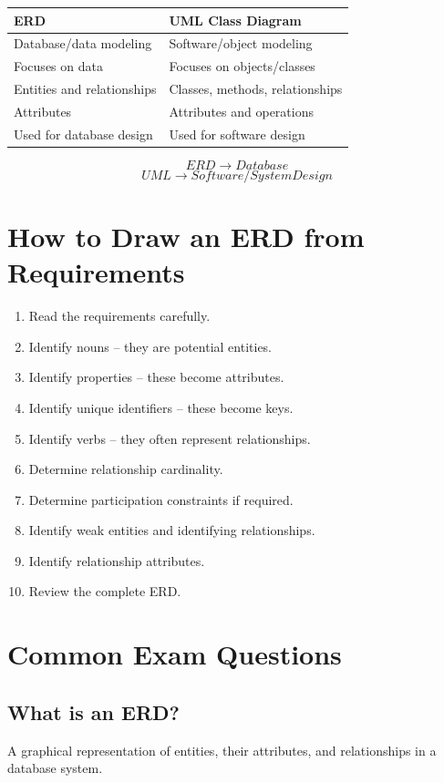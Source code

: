 \documentclass[12pt,a4paper]{article}
\begin{document}
\begin{center}
\begin{tabular}{p{} p{}}
\toprule
\textbf{ERD} & \textbf{UML Class Diagram}\\
\midrule
Database/data modeling & Software/object modeling\\
Focuses on data & Focuses on objects/classes\\
Entities and relationships & Classes, methods, relationships\\
Attributes & Attributes and operations\\
Used for database design & Used for software design\\
\bottomrule
\end{tabular}
\end{center}

\[
ERD \rightarrow Database
\]
\[
UML \rightarrow Software/System Design
\]

\section{How to Draw an ERD from Requirements}

\begin{enumerate}
\item Read the requirements carefully.
\item Identify nouns -- they are potential entities.
\item Identify properties -- these become attributes.
\item Identify unique identifiers -- these become keys.
\item Identify verbs -- they often represent relationships.
\item Determine relationship cardinality.
\item Determine participation constraints if required.
\item Identify weak entities and identifying relationships.
\item Identify relationship attributes.
\item Review the complete ERD.
\end{enumerate}

\section{Common Exam Questions}

\subsection*{What is an ERD?}
A graphical representation of entities, their attributes, and relationships in a database system.
\end{document}
